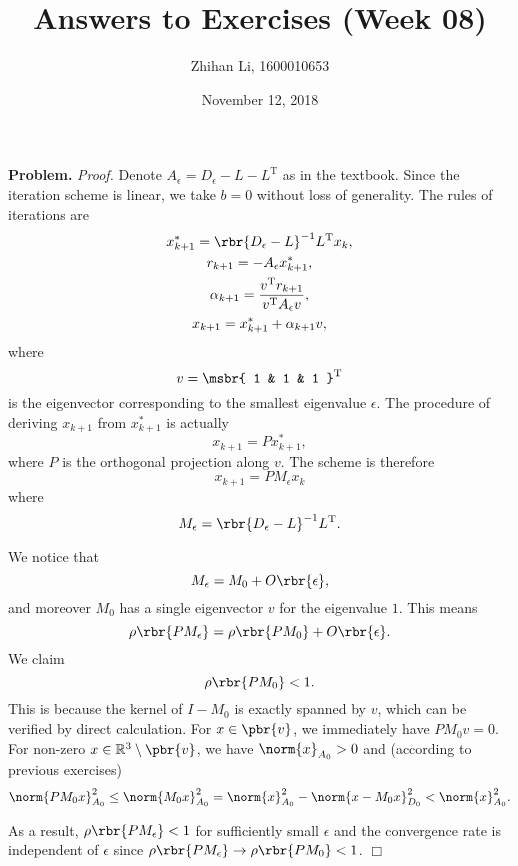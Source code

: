 \documentclass[english, nochinese]{pnote}
\title{Answers to Exercises (Week 08)}
\author{Zhihan Li, 1600010653}
\date{November 12, 2018}
\begin{document}
\maketitle

\textbf{Problem.} \textit{Proof.} Denote $ A_{\epsilon} = D_{\epsilon} - L - L^{\text{T}} $ as in the textbook. Since the iteration scheme is linear, we take $ b = 0 $ without loss of generality. The rules of iterations are
\begin{gather}
x_{ k + 1 }^{\ast} = \rbr{ D_{\epsilon} - L }^{-1} L^{\text{T}} x_k, \\
r_{ k + 1 } = -A_{\epsilon} x_{ k + 1 }^{\ast}, \\
\alpha_{ k + 1 } = \frac{ v^{\text{T}} r_{ k + 1 } }{ v^{\text{T}} A_{\epsilon} v }, \\
x_{ k + 1 } = x_{ k + 1 }^{\ast} + \alpha_{ k + 1 } v,
\end{gather}
where
\begin{equation}
v = \msbr{ 1 & 1 & 1 }^{\text{T}}
\end{equation}
is the eigenvector corresponding to the smallest eigenvalue $\epsilon$. The procedure of deriving $ x_{ k + 1 } $ from $ x_{ k + 1 }^{\ast} $ is actually
\begin{equation}
x_{ k + 1 } = P x_{ k + 1 }^{\ast},
\end{equation}
where $P$ is the orthogonal projection along $v$. The scheme is therefore
\begin{equation}
x_{ k + 1 } = P M_{\epsilon} x_k
\end{equation}
where
\begin{equation}
M_{\epsilon} = \rbr{ D_{\epsilon} - L }^{-1} L^{\text{T}}.
\end{equation}

We notice that
\begin{equation}
M_{\epsilon} = M_0 + O \rbr{\epsilon},
\end{equation}
and moreover $M_0$ has a single eigenvector $v$ for the eigenvalue $1$. This means
\begin{equation}
\rho \rbr{ P M_{\epsilon} } = \rho \rbr{ P M_0 } + O \rbr{\epsilon}.
\end{equation}
We claim
\begin{equation}
\rho \rbr{ P M_0 } < 1.
\end{equation}
This is because the kernel of $ I - M_0 $ is exactly spanned by $v$, which can be verified by direct calculation. For $ x \in \pbr{v} $, we immediately have $ P M_0 v = 0 $. For non-zero $ x \in \mathbb{R}^3 \setminus \pbr{v} $, we have $ \norm{x}_{A_0} > 0 $ and (according to previous exercises)
\begin{equation}
\norm{ P M_0 x }_{A_0}^2 \le \norm{ M_0 x }_{A_0}^2 = \norm{x}_{A_0}^2 - \norm{ x - M_0 x }_{D_0}^2 < \norm{x}_{A_0}^2.
\end{equation}

As a result, $ \rho \rbr{ P M_{\epsilon} } < 1 $ for sufficiently small $\epsilon$ and the convergence rate is independent of $\epsilon$ since $ \rho \rbr{ P M_{\epsilon} } \rightarrow \rho \rbr{ P M_0 } < 1 $.
\hfill$\Box$
\end{document}
